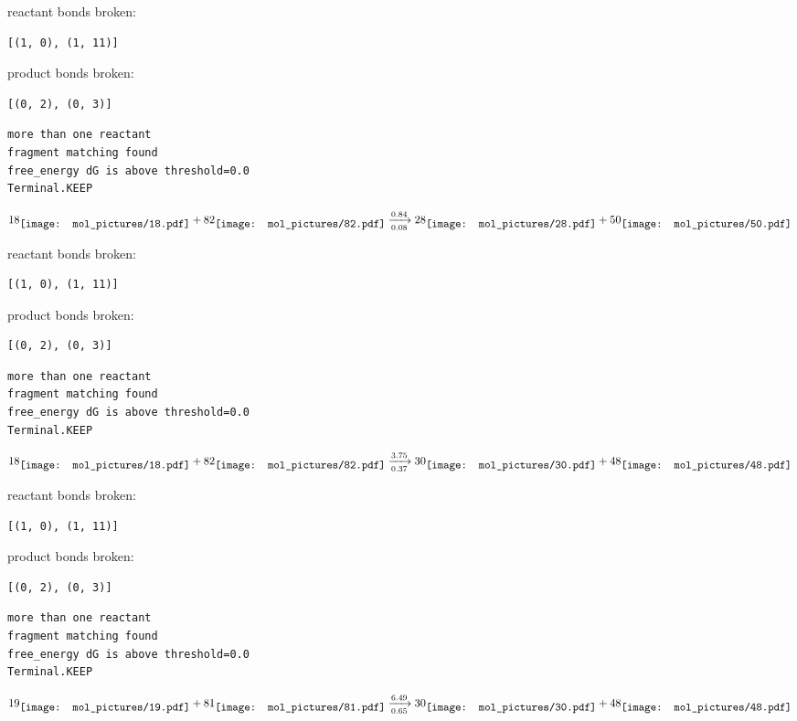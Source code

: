 \documentclass{article}
\begin{document}
reactant bonds broken:\begin{verbatim}
[(1, 0), (1, 11)]
\end{verbatim}
product bonds broken:\begin{verbatim}
[(0, 2), (0, 3)]
\end{verbatim}




\vspace{1cm}
\begin{verbatim}
more than one reactant
fragment matching found
free_energy dG is above threshold=0.0
Terminal.KEEP
\end{verbatim}
$$
18
\raisebox{-.5\height}{\texttt{[image: mol\_pictures/18.pdf]}}
+
82
\raisebox{-.5\height}{\texttt{[image: mol\_pictures/82.pdf]}}
\xrightarrow[0.08]{0.84}
28
\raisebox{-.5\height}{\texttt{[image: mol\_pictures/28.pdf]}}
+
50
\raisebox{-.5\height}{\texttt{[image: mol\_pictures/50.pdf]}}
$$


reactant bonds broken:\begin{verbatim}
[(1, 0), (1, 11)]
\end{verbatim}
product bonds broken:\begin{verbatim}
[(0, 2), (0, 3)]
\end{verbatim}




\vspace{1cm}
\begin{verbatim}
more than one reactant
fragment matching found
free_energy dG is above threshold=0.0
Terminal.KEEP
\end{verbatim}
$$
18
\raisebox{-.5\height}{\texttt{[image: mol\_pictures/18.pdf]}}
+
82
\raisebox{-.5\height}{\texttt{[image: mol\_pictures/82.pdf]}}
\xrightarrow[0.37]{3.75}
30
\raisebox{-.5\height}{\texttt{[image: mol\_pictures/30.pdf]}}
+
48
\raisebox{-.5\height}{\texttt{[image: mol\_pictures/48.pdf]}}
$$


reactant bonds broken:\begin{verbatim}
[(1, 0), (1, 11)]
\end{verbatim}
product bonds broken:\begin{verbatim}
[(0, 2), (0, 3)]
\end{verbatim}




\vspace{1cm}
\begin{verbatim}
more than one reactant
fragment matching found
free_energy dG is above threshold=0.0
Terminal.KEEP
\end{verbatim}
$$
19
\raisebox{-.5\height}{\texttt{[image: mol\_pictures/19.pdf]}}
+
81
\raisebox{-.5\height}{\texttt{[image: mol\_pictures/81.pdf]}}
\xrightarrow[0.65]{6.49}
30
\raisebox{-.5\height}{\texttt{[image: mol\_pictures/30.pdf]}}
+
48
\raisebox{-.5\height}{\texttt{[image: mol\_pictures/48.pdf]}}
$$
\end{document}
